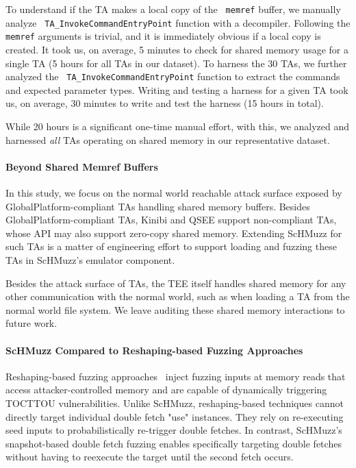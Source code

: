 \documentclass[conference]{IEEEtran} %
\newcommand{\sysname}{ScHMuzz\xspace}
\newcommand{\kinibi}{Kinibi\xspace}
\newcommand{\qsee}{QSEE\xspace}
\newcommand{\numTAsharnessed}{30\xspace}
\providecommand{\DIFaddtex}[1]{{\protect\color{blue} \sf #1}} %
\providecommand{\DIFaddbegin}{} %
\providecommand{\DIFaddend}{} %
\providecommand{\DIFadd}[1]{\texorpdfstring{\DIFaddtex{#1}}{#1}} %
\begin{document}
\DIFadd{To understand if the TA makes a local copy of the }\texttt{\DIFadd{memref}} \DIFadd{buffer, we manually analyze 
}\texttt{\DIFadd{TA\_InvokeCommandEntryPoint}} \DIFadd{function with a decompiler. Following the }\texttt{\DIFadd{memref}} 
\DIFadd{arguments is trivial, and it is immediately obvious if a local copy is created.
It took us, on average, 5 minutes to check for shared memory usage for a single TA (5 hours for all 
TAs in our dataset).
To harness the }\numTAsharnessed \DIFadd{TAs, we further analyzed the }\texttt{\DIFadd{TA\_InvokeCommandEntryPoint}} \DIFadd{function 
to extract the commands and expected parameter types. Writing and testing a harness 
for a given TA took us, on average, 30 minutes to write and test the harness (15 hours in total). 
}

\DIFadd{While 20 hours is a significant one-time manual effort, with this, we analyzed and harnessed 
}\emph{\DIFadd{all}} \DIFadd{TAs operating on shared memory in our representative dataset.
}

\DIFaddend \paragraph{Beyond Shared Memref Buffers}
In this study, we focus on the normal world reachable attack surface exposed by 
GlobalPlatform-compliant TAs handling shared memory buffers. 
Besides GlobalPlatform-compliant TAs, \kinibi and \qsee support non-compliant TAs, 
whose API may also support zero-copy shared memory. Extending 
\sysname for such TAs is a matter of engineering effort to support loading and 
\DIFaddbegin \DIFadd{fuzzing }\DIFaddend these TAs in \sysname's emulator component. 

Besides the attack surface of TAs, the TEE 
itself handles shared memory for any other communication with the normal world, 
such as when loading a TA from the normal world file system. We leave auditing 
these shared memory interactions to future work.

\paragraph{\sysname Compared to Reshaping-based Fuzzing Approaches}

Reshaping-based fuzzing approaches~\cite{morphuzz, chen2024enclavefuzz} 
inject fuzzing inputs at memory reads that access 
attacker-controlled memory and are capable of dynamically triggering TOCTTOU vulnerabilities. 
Unlike \sysname, reshaping-based techniques cannot directly target individual double fetch "use" 
instances. They rely on re-executing seed inputs to probabilistically 
re-trigger double fetches. In contrast, \sysname's snapshot-based double fetch fuzzing 
enables specifically targeting double fetches without having to reexecute the target until 
the second fetch occurs. 
\end{document}
